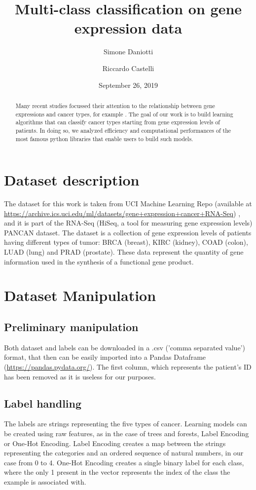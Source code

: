 \documentclass[12pt]{article}
\title{Multi-class classification on gene expression data}
\author[1]{Simone Daniotti}
\author[2]{Riccardo Castelli}
\affil[1]{Physics Department, University of Milan}
\affil[2]{Informatics Department, University of Milan}
\date{September 26, 2019}                     %
\begin{document}
 \maketitle
  

\begin{abstract}
Many recent studies focussed their attention to the relationship between gene expressions and cancer types, for example \cite{wang2018gene}. The goal of our work is to build learning algorithms that can classify cancer types starting from gene expression levels of patients. In doing so, we analyzed efficiency and computational performances of the most famous python libraries that enable users to build such models.
\end{abstract}



\tableofcontents
\newpage


\section{Dataset description}

The dataset for this work is taken from UCI Machine Learning Repo (available at \url{https://archive.ics.uci.edu/ml/datasets/gene+expression+cancer+RNA-Seq}) \cite{Dua:2019}, and it is part of the RNA-Seq (HiSeq, a tool for measuring gene expression levels) PANCAN dataset. The dataset is a collection of gene expression levels of patients having different types of tumor: BRCA (breast), KIRC (kidney), COAD (colon), LUAD (lung) and PRAD (prostate).
These data represent the quantity of gene information used in the synthesis of a functional gene product. 


\section{Dataset Manipulation}


\subsection{Preliminary manipulation}
Both dataset and labels can be downloaded in a .csv ('comma separated value') format, that then can be easily imported into a Pandas Dataframe (\url{https://pandas.pydata.org/}). The first column, which represents the patient's ID has been removed as it is useless for our purposes.


\subsection{Label handling}
The labels are strings representing the five types of cancer. Learning models can be created using raw features, as in the case of trees and forests, Label Encoding or One-Hot Encoding.
Label Encoding creates a map between the strings representing the categories and an ordered sequence of natural numbers, in our case from 0 to 4.
One-Hot Encoding creates a single binary label for each class, where the only 1 present in the vector represents the index of the class the example is associated with.  
\end{document}
